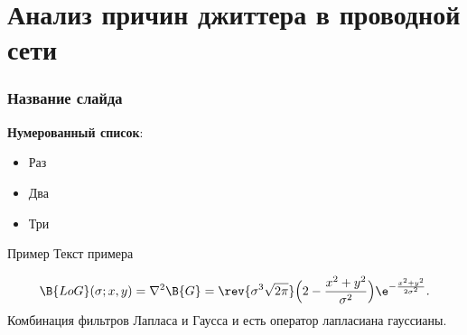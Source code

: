 \documentclass[10pt,pdf,hyperref={unicode}]{beamer}
\begin{document}
\section{Анализ причин джиттера в проводной сети}

\begin{frame}
\frametitle{Название слайда}
    \textbf{Нумерованный список}:
    \begin{itemize}
        \item Раз
        \item Два
        \item Три
    \end{itemize}
\begin{exampleblock}{Пример}
         Текст примера
\end{exampleblock}
\begin{equation}
\B{LoG}(\sigma;x,y) = \nabla^2 \B{G} =
\rev{\sigma^3\sqrt{2\pi}}\Bigl(2-\frac{x^2+y^2}{\sigma^2}\Bigr)
\e^{-\frac{x^2+y^2}{2\sigma^2}}.
\label{log}
\end{equation}
Комбинация фильтров Лапласа и Гаусса и есть оператор лапласиана гауссианы.
\end{frame}
\end{document}
